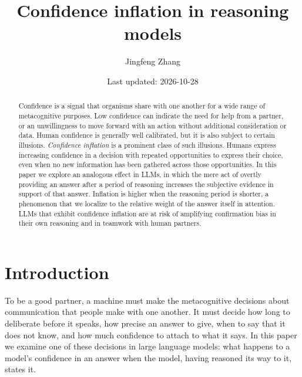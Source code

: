 \documentclass[11pt]{article}
\title{Confidence inflation in reasoning models}
\author{Jingfeng Zhang}
\date{Last updated: 2026-10-28}
\begin{document}
\maketitle

\begin{abstract}

Confidence is a signal that organisms share with one another for a wide range of metacognitive purposes. Low confidence can indicate the need for help from a partner, or an unwillingness to move forward with an action without additional consideration or data. Human confidence is generally well calibrated, but it is also subject to certain illusions. \textit{Confidence inflation} is a prominent class of such illusions. Humans express increasing confidence in a decision with repeated opportunities to express their choice, even when no new information has been gathered across those opportunities. In this paper we explore an analogous effect in LLMs, in which the mere act of overtly providing an answer after a period of reasoning increases the subjective evidence in support of that answer. Inflation is higher when the reasoning period is shorter, a phenomenon that we localize to the relative weight of the answer itself in attention. LLMs that exhibit confidence inflation are at risk of amplifying confirmation bias in their own reasoning and in teamwork with human partners.

\end{abstract}

\section{Introduction}

To be a good partner, a machine must make the metacognitive decisions about communication that people make with one another. It must decide how long to deliberate before it speaks, how precise an answer to give, when to say that it does not know, and how much confidence to attach to what it says. In this paper we examine one of these decisions in large language models: what happens to a model's confidence in an answer when the model, having reasoned its way to it, states it.
\end{document}

